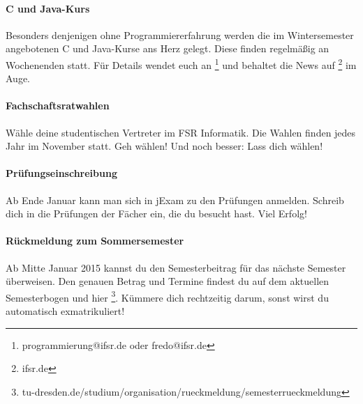 \paragraph{C und Java-Kurs}
Besonders denjenigen ohne Programmiererfahrung werden die im Wintersemester angebotenen C und Java-Kurse ans Herz gelegt.
Diese finden regelmäßig an Wochenenden statt.
Für Details wendet euch an \footnote{programmierung@ifsr.de oder fredo@ifsr.de} und behaltet die News auf \footnote{ifsr.de} im Auge.

\paragraph{Fachschaftsratwahlen}
Wähle deine studentischen Vertreter im FSR Informatik.
Die Wahlen finden jedes Jahr im November statt.
Geh wählen!
Und noch besser: Lass dich wählen!

\paragraph{Prüfungseinschreibung}
Ab Ende Januar kann man sich in jExam zu den Prüfungen anmelden.
Schreib dich in die Prüfungen der Fächer ein, die du besucht hast.
Viel Erfolg!

\paragraph{Rückmeldung zum Sommersemester}
Ab Mitte Januar 2015 kannst du den Semesterbeitrag für das nächste Semester überweisen.
Den genauen Betrag und Termine findest du auf dem aktuellen Semesterbogen und hier \footnote{tu-dresden.de/studium/organisation/rueckmeldung/semesterrueckmeldung}.
Kümmere dich rechtzeitig darum, sonst wirst du automatisch exmatrikuliert!
